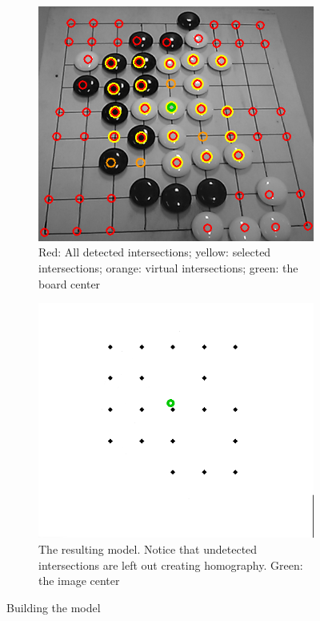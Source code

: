 	\begin{figure}
		\begin{subfigure}{0.45\textwidth}
			\includegraphics[width=\textwidth]{images/buildingModel.png}
			\caption{Red: All detected intersections; yellow: selected intersections; orange: virtual intersections; green: the board center}
			\label{fig:buildModel-input}
		\end{subfigure}
		\hfill
		\begin{subfigure}{0.45\textwidth}
			\includegraphics[width=\textwidth]{images/builtModel.png}
			\caption{The resulting model. Notice that undetected intersections are left out creating homography. Green: the image center}
			\label{fig:buildModel-output}
		\end{subfigure}
		\caption{Building the model}
		\label{fig:buildModel}
	\end{figure}

